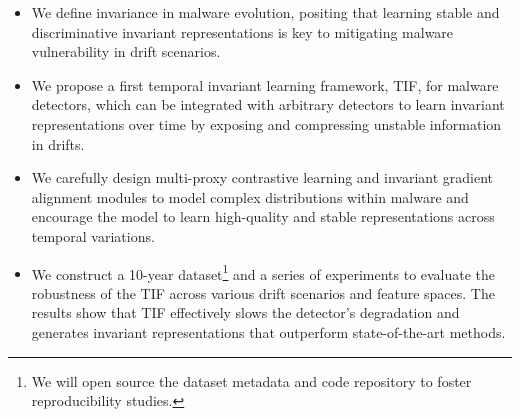 
\begin{itemize}
    \item We define invariance in malware evolution, positing that learning stable and discriminative invariant representations is key to mitigating malware vulnerability in drift scenarios.
    \item We propose a first temporal invariant learning framework, TIF, for malware detectors, which can be integrated with arbitrary detectors to learn invariant representations over time by exposing and compressing unstable information in drifts.
    \item We carefully design multi-proxy contrastive learning and invariant gradient alignment modules to model complex distributions within malware and encourage the model to learn high-quality and stable representations across temporal variations.
    \item We construct a 10-year dataset\footnote{We will open source the dataset metadata and code repository to foster reproducibility studies.} and a series of experiments to evaluate the robustness of the TIF across various drift scenarios and feature spaces. The results show that TIF effectively slows the detector's degradation and generates invariant representations that outperform state-of-the-art methods.
\end{itemize}


